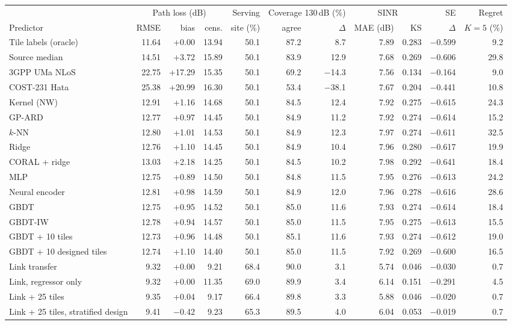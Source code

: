 \begin{tabular}{lrrrrrrrrrr}
\toprule
& \multicolumn{3}{c}{Path loss (dB)} & Serving & \multicolumn{2}{c}{Coverage 130\,dB (\%)} & \multicolumn{2}{c}{SINR} & SE & Regret \\
\cmidrule(lr){2-4}\cmidrule(lr){6-7}\cmidrule(lr){8-9}
Predictor & RMSE & bias & cens. & site (\%) & agree & $\Delta$ & MAE (dB) & KS & $\Delta$ & $K{=}5$ (\%) \\
\midrule
Tile labels (oracle) & 11.64 & +0.00 & 13.94 & 50.1 & 87.2 & 8.7 & 7.89 & 0.283 & \ensuremath{-}0.599 & 9.2 \\
\midrule
Source median & 14.51 & +3.72 & 15.89 & 50.1 & 83.9 & 12.9 & 7.68 & 0.269 & \ensuremath{-}0.606 & 29.8 \\
3GPP UMa NLoS & 22.75 & +17.29 & 15.35 & 50.1 & 69.2 & \ensuremath{-}14.3 & 7.56 & 0.134 & \ensuremath{-}0.164 & 9.0 \\
COST-231 Hata & 25.38 & +20.99 & 16.30 & 50.1 & 53.4 & \ensuremath{-}38.1 & 7.67 & 0.204 & \ensuremath{-}0.441 & 10.8 \\
Kernel (NW) & 12.91 & +1.16 & 14.68 & 50.1 & 84.5 & 12.4 & 7.92 & 0.275 & \ensuremath{-}0.615 & 24.3 \\
GP-ARD & 12.77 & +0.97 & 14.45 & 50.1 & 84.9 & 11.2 & 7.92 & 0.274 & \ensuremath{-}0.614 & 15.2 \\
$k$-NN & 12.80 & +1.01 & 14.53 & 50.1 & 84.9 & 12.3 & 7.97 & 0.274 & \ensuremath{-}0.611 & 32.5 \\
Ridge & 12.76 & +1.10 & 14.45 & 50.1 & 84.9 & 10.4 & 7.96 & 0.280 & \ensuremath{-}0.617 & 19.9 \\
CORAL + ridge & 13.03 & +2.18 & 14.25 & 50.1 & 84.5 & 10.2 & 7.98 & 0.292 & \ensuremath{-}0.641 & 18.4 \\
MLP & 12.75 & +0.89 & 14.50 & 50.1 & 84.8 & 11.5 & 7.95 & 0.276 & \ensuremath{-}0.613 & 24.2 \\
Neural encoder & 12.81 & +0.98 & 14.59 & 50.1 & 84.9 & 12.0 & 7.96 & 0.278 & \ensuremath{-}0.616 & 28.6 \\
GBDT & 12.75 & +0.95 & 14.52 & 50.1 & 85.0 & 11.6 & 7.93 & 0.274 & \ensuremath{-}0.614 & 18.4 \\
GBDT-IW & 12.78 & +0.94 & 14.57 & 50.1 & 85.0 & 11.5 & 7.95 & 0.275 & \ensuremath{-}0.613 & 15.5 \\
GBDT + 10 tiles & 12.73 & +0.96 & 14.48 & 50.1 & 85.1 & 11.6 & 7.93 & 0.274 & \ensuremath{-}0.612 & 19.0 \\
GBDT + 10 designed tiles & 12.74 & +1.10 & 14.40 & 50.1 & 85.0 & 11.5 & 7.92 & 0.269 & \ensuremath{-}0.600 & 16.5 \\
\midrule
Link transfer & 9.32 & +0.00 & 9.21 & 68.4 & 90.0 & 3.1 & 5.74 & 0.046 & \ensuremath{-}0.030 & 0.7 \\
Link, regressor only & 9.32 & +0.00 & 11.35 & 69.0 & 89.9 & 3.4 & 6.14 & 0.151 & \ensuremath{-}0.291 & 4.5 \\
Link + 25 tiles & 9.35 & +0.04 & 9.17 & 66.4 & 89.8 & 3.3 & 5.88 & 0.046 & \ensuremath{-}0.020 & 0.7 \\
Link + 25 tiles, stratified design & 9.41 & \ensuremath{-}0.42 & 9.23 & 65.3 & 89.5 & 4.0 & 6.04 & 0.053 & \ensuremath{-}0.019 & 0.7 \\
\bottomrule
\end{tabular}
